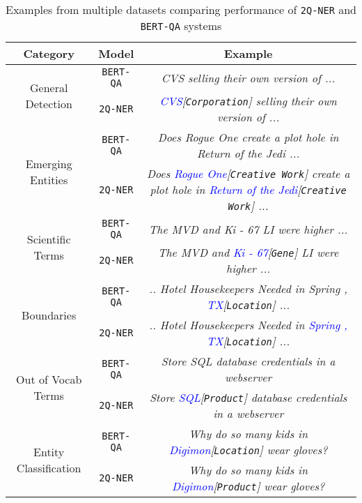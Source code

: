 \begin{table*}[h!]
\centering
\begin{small}
\begin{tabular}{ccc}\toprule
Category & Model & Example \\\toprule
\multirow{2}{*}{General Detection} & \texttt{BERT-QA} & \textit{CVS selling their own version of ...} \\
    & \texttt{2Q-NER} & \textit{\textcolor{blue}{CVS}[\texttt{Corporation}] selling their own version of ...} \\ \midrule
\multirow{2}{*}{Emerging Entities} & \texttt{BERT-QA} & \textit{Does Rogue One create a plot hole in Return of the Jedi ... } \\
    & \texttt{2Q-NER} & \textit{Does \textcolor{blue}{Rogue One}[\texttt{Creative Work}] create a plot hole in \textcolor{blue}{Return of the Jedi}[\texttt{Creative Work}] ... } \\ \midrule
\multirow{2}{*}{Scientific Terms} & \texttt{BERT-QA} & \textit{The MVD and Ki - 67 LI were higher ... } \\
    & \texttt{2Q-NER} & \textit{The MVD and \textcolor{blue}{Ki - 67}[\texttt{Gene}] LI were higher ...} \\ \midrule
\multirow{2}{*}{Boundaries} & \texttt{BERT-QA} & \textit{.. Hotel Housekeepers Needed in Spring , \textcolor{blue}{TX}[\texttt{Location}] ... } \\
    & \texttt{2Q-NER} & \textit{.. Hotel Housekeepers Needed in \textcolor{blue}{Spring , TX}[\texttt{Location}] ... } \\ \midrule
\multirow{2}{*}{Out of Vocab Terms} & \texttt{BERT-QA} & \textit{Store SQL database credentials in a webserver} \\
    & \texttt{2Q-NER} & \textit{Store \textcolor{blue}{SQL}[\texttt{Product}] database credentials in a webserver} \\ \midrule
\multirow{2}{*}{Entity Classification} & \texttt{BERT-QA} & \textit{Why do so many kids in \textcolor{blue}{Digimon}[\texttt{Location}] wear gloves?} \\
    & \texttt{2Q-NER} & \textit{Why do so many kids in \textcolor{blue}{Digimon}[\texttt{Product}] wear gloves?} \\ \bottomrule
\end{tabular}
\caption{Examples from multiple datasets comparing performance of \texttt{2Q-NER} and \texttt{BERT-QA} systems}
    \label{tab:quality}
\end{small}
\end{table*}